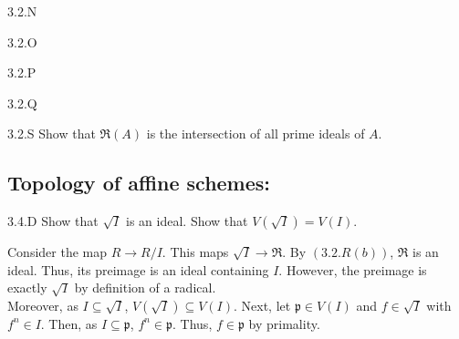 \begin{exercise}{3.2.N}

\end{exercise}
\begin{solution}
    \todo{}
\end{solution}

\begin{exercise}{3.2.O}

\end{exercise}
\begin{solution}
    \todo{}
\end{solution}

\begin{exercise}{3.2.P}

\end{exercise}
\begin{solution}
    \todo{}
\end{solution}

\begin{exercise}{3.2.Q}

\end{exercise}
\begin{solution}
    \todo{}
\end{solution}

\begin{exercise}{3.2.S}
    Show that $\mathfrak R(A)$ is the intersection of all prime ideals of $A$. 
\end{exercise}
\begin{solution}
    \todo{} 
\end{solution}


\subsection{Topology of affine schemes:}

\begin{exercise}{3.4.D}
    Show that $\sqrt{I}$ is an ideal. Show that $V(\sqrt{I}) = V(I)$. 
\end{exercise}
\begin{solution}
    Consider the map $R \to R/I$. This maps $\sqrt{I} \to \mathfrak{R}$. By $(3.2.R(b))$, $\mathfrak R$ is an ideal. Thus, its preimage is an ideal containing $I$. However, the preimage is exactly $\sqrt{I}$ by definition of a radical. \\
    Moreover, as $I \subseteq \sqrt{I}$, $V(\sqrt{I}) \subseteq V(I)$. Next, let $\mathfrak p \in V(I)$ and $f \in \sqrt{I}$ with $f^n \in I$. Then, as $I \subseteq \mathfrak p$, $f^n \in \mathfrak p$. Thus, $f \in \mathfrak p$ by primality.   
\end{solution}

